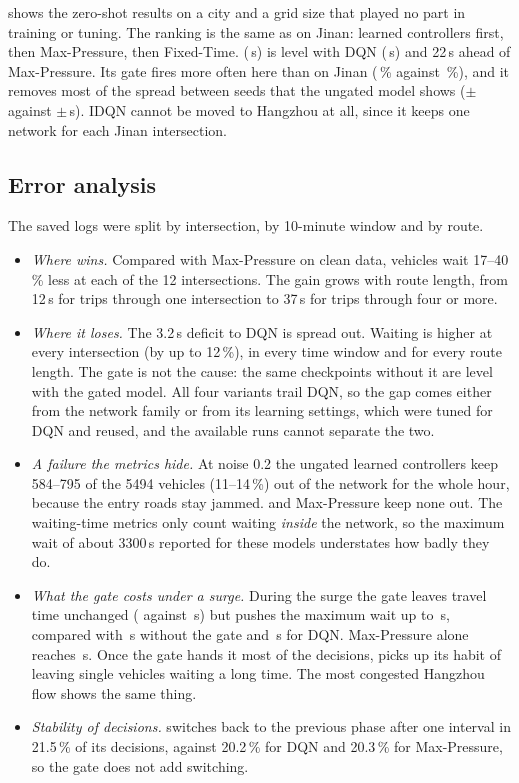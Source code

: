  shows the zero-shot results on a city and a grid size that played no
part in training or tuning. The ranking is the same as on Jinan: learned controllers first,
then Max-Pressure, then Fixed-Time. \ugmarl{} (\,s) is level with DQN
(\,s) and 22\,s ahead of Max-Pressure. Its gate fires more often here
than on Jinan (\,\% against \,\%), and it
removes most of the spread between seeds that the ungated model shows
($\pm$ against $\pm$\,s). IDQN
cannot be moved to Hangzhou at all, since it keeps one network for each Jinan intersection.

\subsection{Error analysis}
The saved logs were split by intersection, by 10-minute window and by route.
\begin{itemize}
\item \emph{Where \ugmarl{} wins.} Compared with Max-Pressure on clean data, vehicles wait
17--40\,\% less at each of the 12 intersections. The gain grows with route length, from 12\,s
for trips through one intersection to 37\,s for trips through four or more.
\item \emph{Where it loses.} The 3.2\,s deficit to DQN is spread out. Waiting is higher at
every intersection (by up to 12\,\%), in every time window and for every route length. The
gate is not the cause: the same checkpoints without it are level with the gated model.
All four \ugmarl{} variants trail DQN, so the gap comes either from the network family or
from its learning settings, which were tuned for DQN and reused, and the available runs
cannot separate the two.
\item \emph{A failure the metrics hide.} At noise 0.2 the ungated learned controllers keep
584--795 of the 5494 vehicles (11--14\,\%) out of the network for the whole hour, because the
entry roads stay jammed. \ugmarl{} and Max-Pressure keep none out. The waiting-time metrics
only count waiting \emph{inside} the network, so the maximum wait of about 3300\,s reported
for these models understates how badly they do.
\item \emph{What the gate costs under a surge.} During the surge the gate leaves travel time
unchanged ( against \,s) but pushes
the maximum wait up to \,s, compared with
\,s without the gate and \,s for
DQN. Max-Pressure alone reaches \,s. Once the gate hands it
most of the decisions, \ugmarl{} picks up its habit of leaving single vehicles waiting a long
time. The most congested Hangzhou flow shows the same thing.
\item \emph{Stability of decisions.} \ugmarl{} switches back to the previous phase after one
interval in 21.5\,\% of its decisions, against 20.2\,\% for DQN and 20.3\,\% for
Max-Pressure, so the gate does not add switching.
\end{itemize}

